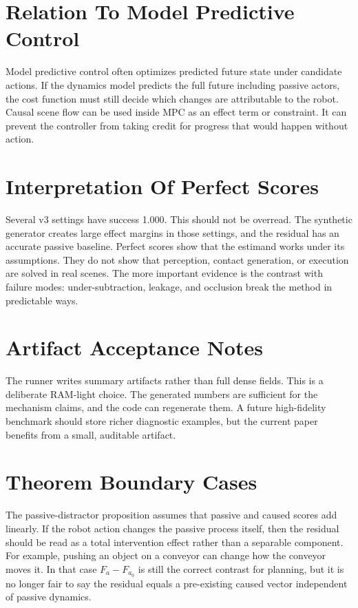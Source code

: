 \documentclass{article}
\newcommand{\noop}{a_0}
\begin{document}
\section{Relation To Model Predictive Control}

Model predictive control often optimizes predicted future state under candidate actions.
If the dynamics model predicts the full future including passive actors, the cost
function must still decide which changes are attributable to the robot.  Causal scene
flow can be used inside MPC as an effect term or constraint.  It can prevent the
controller from taking credit for progress that would happen without action.

\section{Interpretation Of Perfect Scores}

Several v3 settings have success 1.000.  This should not be overread.  The synthetic
generator creates large effect margins in those settings, and the residual has an
accurate passive baseline.  Perfect scores show that the estimand works under its
assumptions.  They do not show that perception, contact generation, or execution are
solved in real scenes.  The more important evidence is the contrast with failure modes:
under-subtraction, leakage, and occlusion break the method in predictable ways.

\section{Artifact Acceptance Notes}

The runner writes summary artifacts rather than full dense fields.  This is a deliberate
RAM-light choice.  The generated numbers are sufficient for the mechanism claims, and
the code can regenerate them.  A future high-fidelity benchmark should store richer
diagnostic examples, but the current paper benefits from a small, auditable artifact.

\section{Theorem Boundary Cases}

The passive-distractor proposition assumes that passive and caused scores add linearly.
If the robot action changes the passive process itself, then the residual should be read
as a total intervention effect rather than a separable component.  For example, pushing
an object on a conveyor can change how the conveyor moves it.  In that case
$F_a-F_{\noop}$ is still the correct contrast for planning, but it is no longer fair to
say the residual equals a pre-existing caused vector independent of passive dynamics.
\end{document}
